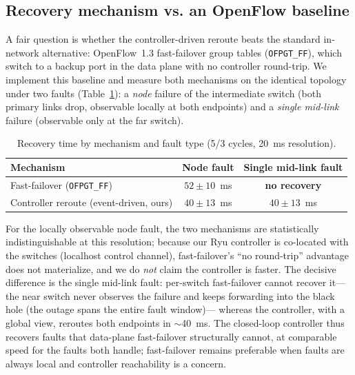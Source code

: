 \documentclass[conference]{IEEEtran}
\begin{document}
\subsection{Recovery mechanism vs. an OpenFlow baseline}
\label{sec:recovery-baseline}
A fair question is whether the controller-driven reroute beats the standard
in-network alternative: OpenFlow~1.3 fast-failover group tables
(\texttt{OFPGT\_FF}), which switch to a backup port in the data plane with no
controller round-trip. We implement this baseline and measure both mechanisms on
the identical topology under two faults (Table~\ref{tab:recovery}): a \emph{node}
failure of the intermediate switch (both primary links drop, observable locally at
both endpoints) and a \emph{single mid-link} failure (observable only at the far
switch). %

\begin{table}[t]
\caption{Recovery time by mechanism and fault type (5/3 cycles, 20~ms resolution).}
\label{tab:recovery}
\centering
\begin{tabular}{lcc}
\toprule
Mechanism & Node fault & Single mid-link fault \\
\midrule
Fast-failover (\texttt{OFPGT\_FF}) & $52\pm10$~ms & \textbf{no recovery} \\
Controller reroute (event-driven, ours) & $40\pm13$~ms & $40\pm13$~ms \\
\bottomrule
\end{tabular}
\end{table}

For the locally observable node fault, the two mechanisms are statistically
indistinguishable at this resolution; because our Ryu controller is co-located
with the switches (localhost control channel), fast-failover's ``no round-trip''
advantage does not materialize, and we do \emph{not} claim the controller is
faster. The decisive difference is the single mid-link fault: per-switch
fast-failover cannot recover it---the near switch never observes the failure and
keeps forwarding into the black hole (the outage spans the entire fault window)---
whereas the controller, with a global view, reroutes both endpoints in $\sim$40~ms.
The closed-loop controller thus recovers faults that data-plane fast-failover
structurally cannot, at comparable speed for the faults both handle; fast-failover
remains preferable when faults are always local and controller reachability is a
concern.
\end{document}
